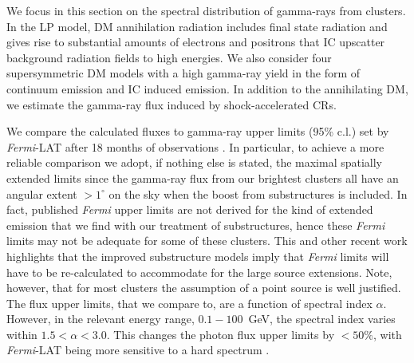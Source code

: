 \documentclass[10pt,aps,pra,reprint,amsmath,amsfonts,amssymb,showpacs,nofootinbib,floatfix]{revtex4-1}
\newcommand{\Fermi}{{\em Fermi}\xspace}
\begin{document}
We focus in this section on the spectral distribution of gamma-rays
from clusters. In the LP model, DM annihilation radiation includes
final state radiation and gives rise to substantial amounts of
electrons and positrons that IC upscatter background radiation fields
to high energies. We also consider four supersymmetric DM models with
a high gamma-ray yield in the form of continuum emission and IC
induced emission. In addition to the annihilating DM, we estimate the
gamma-ray flux induced by shock-accelerated CRs.

We compare the calculated fluxes to gamma-ray upper limits (95\% c.l.)
set by \Fermi-LAT after 18 months of observations
\cite{2010ApJ...717L..71A}. In particular, to achieve a more reliable
comparison we adopt, if nothing else is stated, the maximal spatially
extended limits since the gamma-ray flux from our brightest clusters
all have an angular extent $>1^\circ$ on the sky when the boost from
substructures is included. In fact, published \Fermi upper limits are
not derived for the kind of extended emission that we find with our
treatment of substructures, hence these \Fermi limits may not be
adequate for some of these clusters. This and other recent work
highlights that the improved substructure models imply that \Fermi
limits will have to be re-calculated to accommodate for the large
source extensions. Note, however, that for most clusters the
assumption of a point source is well justified. The flux upper
limits, that we compare to, are a function of spectral index
$\alpha$. However, in the relevant energy range, $0.1-100$~GeV, the
spectral index varies within $1.5 < \alpha < 3.0$. This changes the
photon flux upper limits by $<50\%$, with \Fermi-LAT being more
sensitive to a hard spectrum \cite{2010ApJ...717L..71A}.
\end{document}
